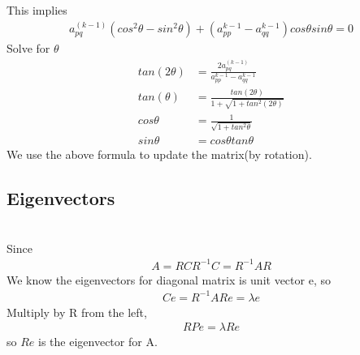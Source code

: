 \documentclass[a4paper]{article}
\begin{document}
This implies
\begin{align*}
	a_{pq}^{(k-1)} (cos^2 \theta - sin^2 \theta) + (a_{pp}^{k-1} - a_{qq}^{k-1}) cos \theta sin \theta = 0
\end{align*}
Solve for $\theta$
\begin{align*}
	tan(2\theta) & = \frac{2 a_{pq}^{(k-1)}}{a_{pp}^{k-1} - a_{qq}^{k-1}} \\
	tan(\theta) & = \frac{tan(2 \theta)}{1 + \sqrt{1 + tan^2 (2 \theta)}} \\
	cos \theta & = \frac{1}{\sqrt{1 + tan^2 \theta}} \\
	sin \theta & = cos \theta tan \theta
\end{align*}
We use the above formula to update the matrix(by rotation). \\
\subsection{Eigenvectors}\\
Since 
\begin{align*}
	A = R C R^{-1}
	C = R^{-1} A R 
\end{align*}
We know the eigenvectors for diagonal matrix is unit vector e, so
\begin{align*}
	Ce = R^{-1} A R e = \lambda e
\end{align*}
Multiply by R from the left, 
\begin{align*}
	RPe = \lambda Re
\end{align*}
so $Re$ is the eigenvector for A.
\end{document}
